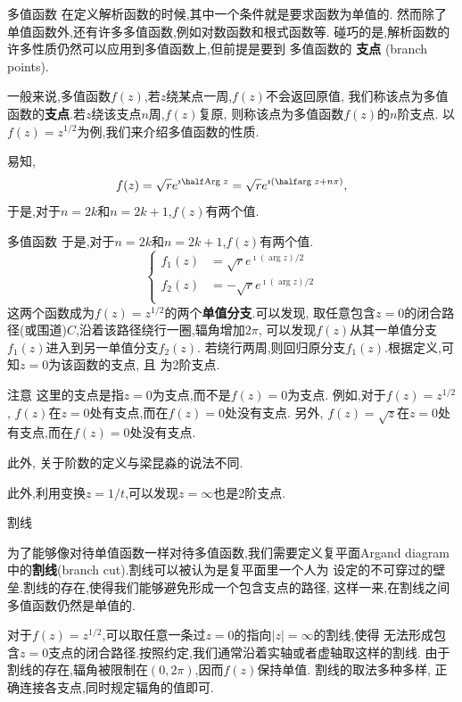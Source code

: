 \documentclass[fontset=windows, chinese, 10pt]{beamer}
\begin{document}
\begin{frame}{多值函数}
在定义解析函数的时候,其中一个条件就是要求函数为单值的.
然而除了单值函数外,还有许多多值函数,例如对数函数和根式函数等.
碰巧的是,解析函数的许多性质仍然可以应用到多值函数上,但前提是要到
多值函数的 \textbf{支点} (branch points).

一般来说,多值函数$f(z)$,若$z$绕某点一周,$f(z)$不会返回原值,
我们称该点为多值函数的\textbf{支点}.若$z$绕该支点$n$周,$f(z)$复原,
则称该点为多值函数$f(z)$的$n$阶支点.
以$f(z) = z^{1/2}$为例,我们来介绍多值函数的性质.

易知,\[
    f(z) = \sqrt{r} e^{\imath \half  \Arg z}
    =  \sqrt{r} e^{\imath \left( \half \arg z + n \pi \right)},
    \]
于是,对于$n= 2k$和$n=2k+1$,$f(z)$有两个值.
\end{frame}


\begin{frame}{多值函数}
于是,对于$n= 2k$和$n=2k+1$,$f(z)$有两个值.
\begin{equation}
    \left\{\begin{aligned}
    f_1(z) & =\sqrt{r}  e^{\imath(\arg z) / 2} \\
    f_2(z) & =-\sqrt{r}  e^{\imath(\arg z) / 2} \\
    \end{aligned}\right.
\end{equation}
这两个函数成为$f(z)= z^{1/2}$的两个\textbf{单值分支}.可以发现,
取任意包含$z=0$的闭合路径(或围道)$C$,沿着该路径绕行一圈,辐角增加$2\pi$,
可以发现$f(z)$从其一单值分支$f_1(z)$进入到另一单值分支$f_2(z)$.
若绕行两周,则回归原分支$f_1(z)$.根据定义,可知$z=0$为该函数的支点, 且
为2阶支点.

\begin{alertblock}{注意}
  \small
    这里的支点是指$z=0$为支点,而不是$f(z)=0$为支点.
    例如,对于$f(z) = z^{1/2}$, $f(z)$在$z=0$处有支点,而在$f(z)=0$处没有支点.
    另外, $f(z) = \sqrt{z}$在$z=0$处有支点,而在$f(z)=0$处没有支点.
    
    此外, 关于阶数的定义与梁昆淼的说法不同.
\end{alertblock}
此外,利用变换$z=1/t$,可以发现$z=\infty$也是2阶支点.

\end{frame}

\begin{frame}{割线}

为了能够像对待单值函数一样对待多值函数,我们需要定义复平面Argand diagram
中的\textbf{割线}(branch cut).割线可以被认为是复平面里一个人为
设定的不可穿过的壁垒.割线的存在,使得我们能够避免形成一个包含支点的路径,
这样一来,在割线之间多值函数仍然是单值的.

对于$f(z)=z^{1/2}$,可以取任意一条过$z=0$的指向$|z|=\infty$的割线,使得
无法形成包含$z=0$支点的闭合路径.按照约定,我们通常沿着实轴或者虚轴取这样的割线.
由于割线的存在,辐角被限制在$(0,2\pi)$,因而$f(z)$保持单值.
割线的取法多种多样, 正确连接各支点,同时规定辐角的值即可.
\end{frame}
\end{document}
